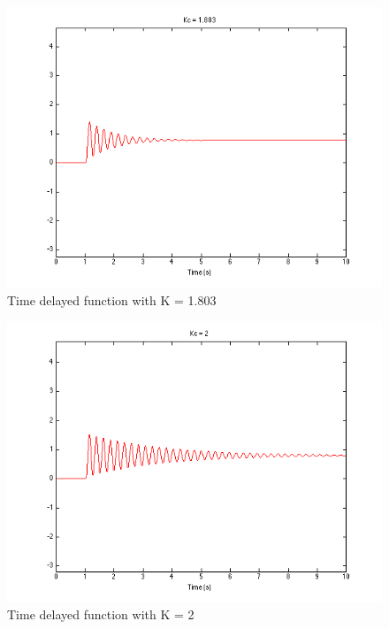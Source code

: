 \documentclass[english]{article}
\begin{document}
\FloatBarrier
\begin{figure}[h!]
\includegraphics[width = \linewidth]{nunstablelarge.png}
\caption{Time delayed function with K = 1.803}
\end{figure}
\begin{figure}[h!]
\includegraphics[width = \linewidth]{highnstable.png}
\caption{Time delayed function with K = 2}
\end{figure}
\FloatBarrier
\end{document}
